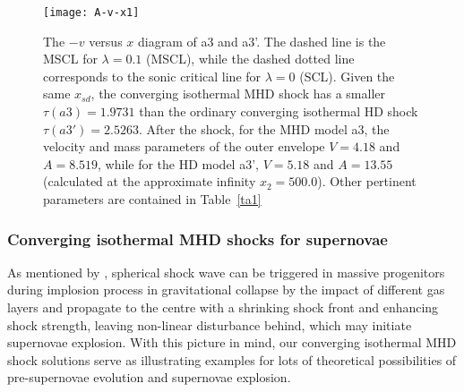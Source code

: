 \documentclass[fleqn,usenatbib]{mnras}
\begin{document}
\begin{figure}
\centering
\texttt{[image: A-v-x1]}
\caption{The $-v$ versus $x$ diagram of a3 and a3'. The dashed line is the MSCL for $\lambda=0.1$ (MSCL), while the dashed dotted line corresponds to the sonic critical line for $\lambda=0$ (SCL). Given the same $x_{sd}$, the converging isothermal MHD shock has a smaller $\tau(a3)=1.9731$ than the ordinary converging isothermal HD shock $\tau(a3')=2.5263$. After the shock, for the MHD model a3, the velocity and mass parameters of the outer envelope $V=4.18$ and $A=8.519$, while for the HD model a3', $V=5.18$ and $A=13.55$ (calculated at the approximate infinity $x_{2}=500.0$). Other pertinent parameters are contained in Table~\ref{ta1}}
\label{fa1}
\end{figure}

\subsubsection{Converging isothermal MHD shocks for supernovae}
As mentioned by \citet{lou2014self}, spherical shock wave can be triggered in massive progenitors during implosion process in gravitational collapse by the impact of different gas layers and propagate to the centre with a shrinking shock front and enhancing shock strength, leaving non-linear disturbance behind, which may initiate supernovae explosion. With this picture in mind, our converging isothermal MHD shock solutions serve as illustrating examples for lots of theoretical possibilities of pre-supernovae evolution and supernovae explosion. 
\end{document}
